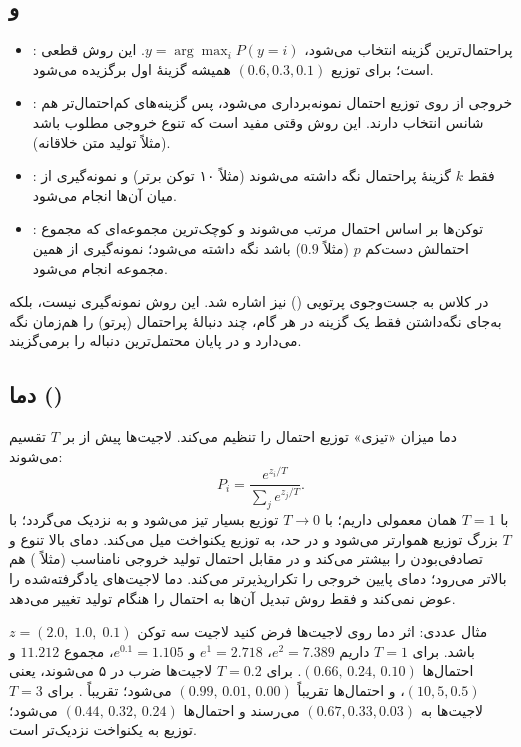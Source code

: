 \subsection{ و }
\begin{itemize}
  \item {}: پراحتمال‌ترین گزینه انتخاب می‌شود، \mbox{$y=\arg\max_i P(y=i)$}. این روش قطعی است؛ برای توزیع \mbox{$(0.6,0.3,0.1)$} همیشه گزینهٔ اول برگزیده می‌شود.
  \item {}: خروجی از روی توزیع احتمال نمونه‌برداری می‌شود، پس گزینه‌های کم‌احتمال‌تر هم شانس انتخاب دارند. این روش وقتی مفید است که تنوع خروجی مطلوب باشد (مثلاً تولید متن خلاقانه).
  \item {}: فقط $k$ گزینهٔ پراحتمال نگه داشته می‌شوند (مثلاً ۱۰ توکن برتر) و نمونه‌گیری از میان آن‌ها انجام می‌شود.
  \item {}: توکن‌ها بر اساس احتمال مرتب می‌شوند و کوچک‌ترین مجموعه‌ای که مجموع احتمالش دست‌کم $p$ (مثلاً $0.9$) باشد نگه داشته می‌شود؛ نمونه‌گیری از همین مجموعه انجام می‌شود.
\end{itemize}
در کلاس به جست‌وجوی پرتویی () نیز اشاره شد. این روش نمونه‌گیری نیست، بلکه به‌جای نگه‌داشتن فقط یک گزینه در هر گام، چند دنبالهٔ پراحتمال (پرتو) را هم‌زمان نگه می‌دارد و در پایان محتمل‌ترین دنباله را برمی‌گزیند.

\subsection{دما ()}
دما میزان «تیزی» توزیع احتمال را تنظیم می‌کند. لاجیت‌ها پیش از  بر $T$ تقسیم می‌شوند:
\[
P_i=\frac{e^{z_i/T}}{\sum_j e^{z_j/T}} .
\]
با $T=1$ همان  معمولی داریم؛ با $T\to0$ توزیع بسیار تیز می‌شود و به  نزدیک می‌گردد؛ با $T$ بزرگ توزیع هموارتر می‌شود و در حد، به توزیع یکنواخت میل می‌کند. دمای بالا تنوع و تصادفی‌بودن را بیشتر می‌کند و در مقابل احتمال تولید خروجی نامناسب (مثلاً ) هم بالاتر می‌رود؛ دمای پایین خروجی را تکرارپذیرتر می‌کند. دما لاجیت‌های یادگرفته‌شده را عوض نمی‌کند و فقط روش تبدیل آن‌ها به احتمال را هنگام تولید تغییر می‌دهد.

\begin{addedbox}{مثال عددی: اثر دما روی لاجیت‌ها}
فرض کنید لاجیت سه توکن \mbox{$z=(2.0,\;1.0,\;0.1)$} باشد. برای $T=1$ داریم \mbox{$e^{2}=7.389$}، \mbox{$e^{1}=2.718$} و \mbox{$e^{0.1}=1.105$}، مجموع $11.212$ و احتمال‌ها \mbox{$(0.66,\,0.24,\,0.10)$}. برای $T=0.2$ لاجیت‌ها ضرب در ۵ می‌شوند، یعنی \mbox{$(10,5,0.5)$}، و احتمال‌ها تقریباً \mbox{$(0.99,\,0.01,\,0.00)$} می‌شود؛ تقریباً . برای $T=3$ لاجیت‌ها به \mbox{$(0.67,0.33,0.03)$} می‌رسند و احتمال‌ها \mbox{$(0.44,\,0.32,\,0.24)$} می‌شود؛ توزیع به یکنواخت نزدیک‌تر است.
\end{addedbox}

